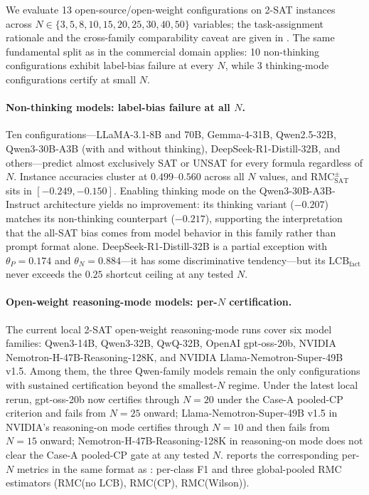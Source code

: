 \documentclass[conference]{IEEEtran}
\theoremstyle{remark}
\newcommand{\LCB}{\mathrm{LCB}}
\newcommand{\RMCSAT}{\mathrm{RMC}_{\mathrm{SAT}}}
\begin{document}
We evaluate 13 open-source/open-weight configurations on 2-SAT instances across $N\in\{3,5,8,10,15,20,25,30,40,50\}$ variables; the task-assignment rationale and the cross-family comparability caveat are given in .
The same fundamental split as in the commercial domain applies: 10 non-thinking configurations exhibit label-bias failure at every $N$, while 3 thinking-mode configurations certify at small $N$.

\paragraph{Non-thinking models: label-bias failure at all $N$.}
Ten configurations---LLaMA-3.1-8B and 70B, Gemma-4-31B, Qwen2.5-32B, Qwen3-30B-A3B (with and without thinking), DeepSeek-R1-Distill-32B, and others---predict almost exclusively SAT or UNSAT for every formula regardless of $N$.
Instance accuracies cluster at $0.499$--$0.560$ across all $N$ values, and $\RMCSAT^{\pm}$ sits in $[-0.249, -0.150]$.
Enabling thinking mode on the Qwen3-30B-A3B-Instruct architecture yields no improvement: its thinking variant ($-0.207$) matches its non-thinking counterpart ($-0.217$), supporting the interpretation that the all-SAT bias comes from model behavior in this family rather than prompt format alone.
DeepSeek-R1-Distill-32B is a partial exception with $\theta_P=0.174$ and $\theta_N=0.884$---it has some discriminative tendency---but its $\LCB_{\mathrm{fact}}$ never exceeds the $0.25$ shortcut ceiling at any tested $N$.

\paragraph{Open-weight reasoning-mode models: per-$N$ certification.}
The current local 2-SAT open-weight reasoning-mode runs cover six model families: Qwen3-14B, Qwen3-32B, QwQ-32B, OpenAI gpt-oss-20b, NVIDIA Nemotron-H-47B-Reasoning-128K, and NVIDIA Llama-Nemotron-Super-49B v1.5.
Among them, the three Qwen-family models remain the only configurations with sustained certification beyond the smallest-$N$ regime.
Under the latest local rerun, gpt-oss-20b now certifies through $N=20$ under the Case-A pooled-CP criterion and fails from $N=25$ onward; Llama-Nemotron-Super-49B v1.5 in NVIDIA's reasoning-on mode certifies through $N=10$ and then fails from $N=15$ onward; Nemotron-H-47B-Reasoning-128K in reasoning-on mode does not clear the Case-A pooled-CP gate at any tested $N$.
 reports the corresponding per-$N$ metrics in the same format as : per-class F1 and three global-pooled RMC estimators (RMC(no LCB), RMC(CP), RMC(Wilson)).
\end{document}
